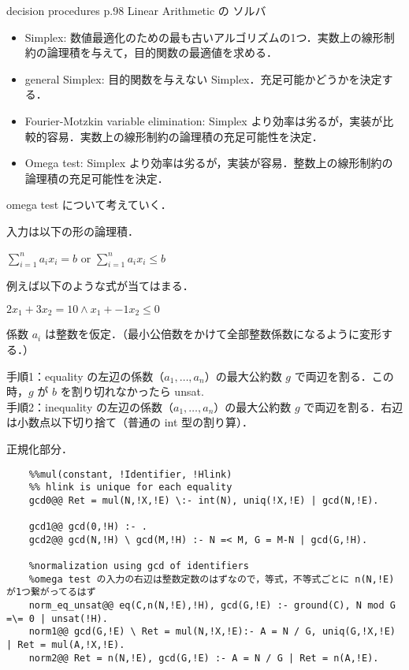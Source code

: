 decision procedures p.98
Linear Arithmetic の ソルバ
\begin{itemize}
    \item Simplex: 数値最適化のための最も古いアルゴリズムの1つ．実数上の線形制約の論理積を与えて，目的関数の最適値を求める．
    \item general Simplex: 目的関数を与えない Simplex．充足可能かどうかを決定する．
    \item Fourier-Motzkin variable elimination: Simplex より効率は劣るが，実装が比較的容易．実数上の線形制約の論理積の充足可能性を決定．
    \item Omega test: Simplex より効率は劣るが，実装が容易．整数上の線形制約の論理積の充足可能性を決定．
\end{itemize}

omega test について考えていく．

入力は以下の形の論理積．
\begin{center}
    $ \sum_{i=1}^na_ix_i=b$ or $\sum_{i=1}^na_ix_i\leq b$
\end{center}
例えば以下のような式が当てはまる．
\begin{center}
    $ 2x_1 + 3x_2 = 10 \wedge x_1 + -1x_2\leq 0$
\end{center}
係数 $a_i$ は整数を仮定．（最小公倍数をかけて全部整数係数になるように変形する．）

手順1：equality の左辺の係数（$a_1,\dots,a_n$）の最大公約数 $g$ で両辺を割る．この時，$g$ が $b$ を割り切れなかったら unsat.\\
手順2：inequality の左辺の係数（$a_1,\dots,a_n$）の最大公約数 $g$ で両辺を割る．右辺は小数点以下切り捨て（普通の int 型の割り算）．

正規化部分．
\begin{lstlisting}
    %%mul(constant, !Identifier, !Hlink)
    %% hlink is unique for each equality
    gcd0@@ Ret = mul(N,!X,!E) \:- int(N), uniq(!X,!E) | gcd(N,!E).
    
    gcd1@@ gcd(0,!H) :- .
    gcd2@@ gcd(N,!H) \ gcd(M,!H) :- N =< M, G = M-N | gcd(G,!H).
    
    %normalization using gcd of identifiers 
    %omega test の入力の右辺は整数定数のはずなので，等式，不等式ごとに n(N,!E) が1つ繋がってるはず
    norm_eq_unsat@@ eq(C,n(N,!E),!H), gcd(G,!E) :- ground(C), N mod G =\= 0 | unsat(!H).
    norm1@@ gcd(G,!E) \ Ret = mul(N,!X,!E):- A = N / G, uniq(G,!X,!E) | Ret = mul(A,!X,!E).
    norm2@@ Ret = n(N,!E), gcd(G,!E) :- A = N / G | Ret = n(A,!E).
\end{lstlisting}

